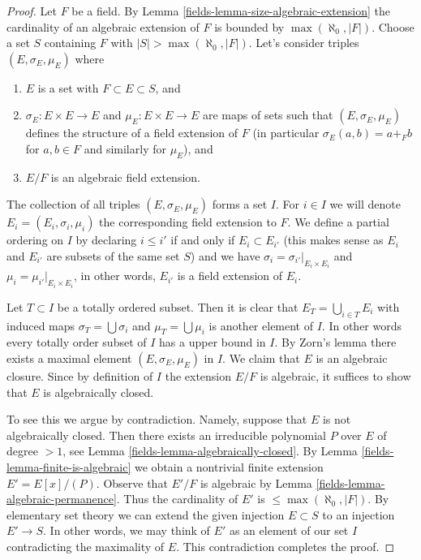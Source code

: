 \begin{proof}

Let $F$ be a field. By Lemma \ref{fields-lemma-size-algebraic-extension} the
cardinality of an algebraic extension of $F$ is bounded by
$\max(\aleph_0, |F|)$. Choose a set $S$ containing $F$ with
$|S| > \max(\aleph_0, |F|)$. Let's consider triples
$(E, \sigma_E, \mu_E)$ where
\begin{enumerate}
\item $E$ is a set with $F \subset E \subset S$, and
\item $\sigma_E : E \times E \to E$ and $\mu_E : E \times E \to E$
are maps of sets such that $(E, \sigma_E, \mu_E)$ defines the structure
of a field extension of $F$ (in particular $\sigma_E(a, b) = a +_F b$
for $a, b \in F$ and similarly for $\mu_E$), and
\item $E/F$ is an algebraic field extension.
\end{enumerate}
The collection of all triples $(E, \sigma_E, \mu_E)$ forms a set $I$.
For $i \in I$ we will denote $E_i = (E_i, \sigma_i, \mu_i)$ the
corresponding field extension to $F$. We define a partial ordering on
$I$ by declaring $i \leq i'$ if and only if $E_i \subset E_{i'}$
(this makes sense as $E_i$ and $E_{i'}$ are subsets of the same set $S$)
and we have $\sigma_i = \sigma_{i'}|_{E_i \times E_i}$ and
$\mu_i = \mu_{i'}|_{E_i \times E_i}$, in other words, $E_{i'}$ is a field
extension of $E_i$.

\medskip\noindent
Let $T \subset I$ be a totally ordered subset. Then it is clear that
$E_T = \bigcup_{i \in T} E_i$ with induced maps $\sigma_T = \bigcup \sigma_i$
and $\mu_T = \bigcup \mu_i$ is another element of $I$. In other words
every totally order subset of $I$ has a upper bound in $I$. By Zorn's lemma
there exists a maximal element $(E, \sigma_E, \mu_E)$ in $I$. We claim that
$E$ is an algebraic closure. Since by definition of $I$ the extension
$E/F$ is algebraic, it suffices to show that $E$ is algebraically closed.

\medskip\noindent
To see this we argue by contradiction. Namely, suppose that $E$ is not
algebraically closed. Then there exists an irreducible polynomial
$P$ over $E$ of degree $> 1$, see Lemma \ref{fields-lemma-algebraically-closed}.
By Lemma \ref{fields-lemma-finite-is-algebraic} we obtain a nontrivial finite
extension $E' = E[x]/(P)$. Observe that $E'/F$ is algebraic by
Lemma \ref{fields-lemma-algebraic-permanence}.
Thus the cardinality of $E'$ is $\leq \max(\aleph_0, |F|)$.
By elementary set theory we can extend the given injection
$E \subset S$ to an injection $E' \to S$. In other words, we may
think of $E'$ as an element of our set $I$ contradicting the
maximality of $E$. This contradiction completes the proof.
\end{proof}


